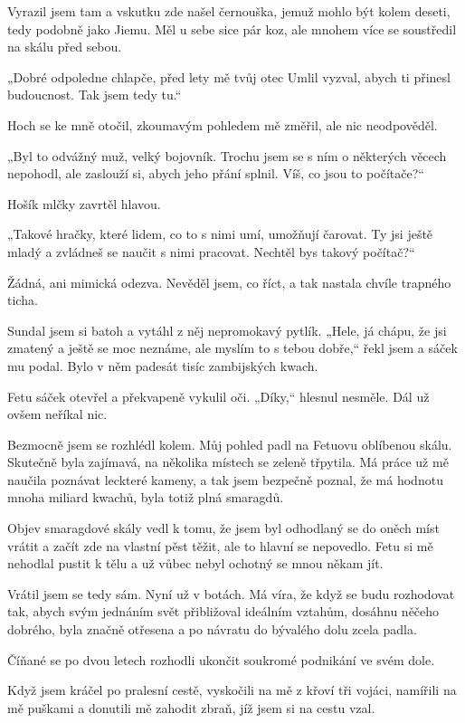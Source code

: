 Vyrazil jsem tam a vskutku zde našel černouška, jemuž mohlo být kolem deseti, tedy podobně jako Jiemu. Měl u sebe sice pár koz, ale mnohem více se soustředil na skálu před sebou.

„Dobré odpoledne chlapče, před lety mě tvůj otec Umlil vyzval, abych ti přinesl budoucnost. Tak jsem tedy tu.“

Hoch se ke mně otočil, zkoumavým pohledem mě změřil, ale nic neodpověděl.
	
 „Byl to odvážný muž, velký bojovník. Trochu jsem se s ním o některých věcech nepohodl, ale zaslouží si, abych jeho přání splnil. Víš, co jsou to počítače?“

Hošík mlčky zavrtěl hlavou.

„Takové hračky, které lidem, co to s nimi umí, umožňují čarovat. Ty jsi ještě mladý a zvládneš se naučit s nimi pracovat. Nechtěl bys takový počítač?“

Žádná, ani mimická odezva. Nevěděl jsem, co říct, a tak nastala chvíle trapného ticha.

Sundal jsem si batoh a vytáhl z něj nepromokavý pytlík. „Hele, já chápu, že jsi zmatený a ještě se moc neznáme, ale myslím to s tebou dobře,“ řekl jsem a sáček mu podal. Bylo v něm padesát tisíc zambijských kwach. 

Fetu sáček otevřel a překvapeně vykulil oči. „Díky,“ hlesnul nesměle. Dál už ovšem neříkal nic.

Bezmocně jsem se rozhlédl kolem. Můj pohled padl na Fetuovu oblíbenou skálu. Skutečně byla zajímavá, na několika místech se zeleně třpytila. Má práce už mě naučila poznávat leckteré kameny, a tak jsem bezpečně poznal, že má hodnotu mnoha miliard kwachů, byla totiž plná smaragdů. 

Objev smaragdové skály vedl k tomu, že jsem byl odhodlaný se do oněch míst vrátit a začít zde na vlastní pěst těžit, ale to hlavní se nepovedlo. Fetu si mě nehodlal pustit k tělu a už vůbec nebyl ochotný se mnou někam jít.

Vrátil jsem se tedy sám. Nyní už v botách. Má víra, že když se budu rozhodovat tak, abych svým jednáním svět přibližoval ideálním vztahům, dosáhnu něčeho dobrého, byla značně otřesena a po návratu do bývalého dolu zcela padla.

Číňané se po dvou letech rozhodli ukončit soukromé podnikání ve svém dole. 

Když jsem kráčel po pralesní cestě, vyskočili na mě z křoví tři vojáci, namířili na mě puškami a donutili mě zahodit zbraň, jíž jsem si na cestu vzal.
	
